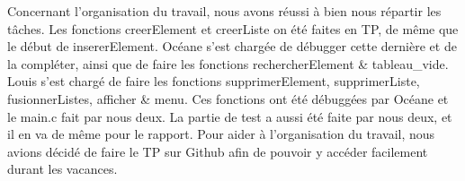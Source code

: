 \documentclass[11pt]{report}
\begin{document}
\medskip

Concernant l'organisation du travail, nous avons réussi à bien nous répartir les tâches. Les fonctions creerElement et creerListe on été faites en TP, de même que le début de insererElement. Océane s'est chargée de débugger cette dernière et de la compléter, ainsi que de faire les fonctions rechercherElement & tableau\_vide. Louis s'est chargé de faire les fonctions supprimerElement, supprimerListe, fusionnerListes, afficher & menu. Ces fonctions ont été débuggées par Océane et le main.c fait par nous deux. La partie de test a aussi été faite par nous deux, et il en va de même pour le rapport.
Pour aider à l'organisation du travail, nous avions décidé de faire le TP sur Github afin de pouvoir y accéder facilement durant les vacances.
\end{document}
